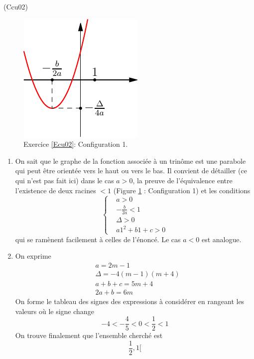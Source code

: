 \begin{tiny}(Ccu02)\end{tiny}
\begin{figure}[h]
  \centering
  \includegraphics{./Ccu02_1.pdf}
  \caption{Exercice \ref{Ecu02}: Configuration 1.}
  \label{fig:Ccu02_1}
\end{figure}
\begin{enumerate}
  \item On sait que le graphe de la fonction associée à un trinôme est une parabole qui peut être orientée vers le haut ou vers le bas.\newline
  Il convient de détailler (ce qui n'est pas fait ici) dans le cas $a>0$, la preuve de l'équivalence entre l'existence de deux racines $<1$ (Figure \ref{fig:Ccu02_1} : Configuration 1) et les conditions
\begin{displaymath}
  \left\lbrace 
\begin{aligned}
&a>0\\ &-\frac{b}{2a}<1 \\ &\Delta > 0 \\ &a1^2+b1+c >0  
\end{aligned}
\right. 
\end{displaymath}
qui se ramènent facilement à celles de l'énoncé. Le cas $a<0$ est analogue.
  \item On exprime
\begin{align*}
  &a = 2m-1 \\
  &\Delta = -4(m-1)(m+4)\\
  &a+b+c = 5m+4 \\
  &2a+b =6m
\end{align*}
On forme le tableau des signes des expressions à considérer en rangeant les valeurs où le signe change
\begin{displaymath}
  -4  < -\frac{4}{5} < 0 < \frac{1}{2} < 1
\end{displaymath}
On trouve finalement que l'ensemble cherché est
\begin{displaymath}
  [-\frac{5}{4},0[ \,\cup\, ]\frac{1}{2},1[
\end{displaymath}

\end{enumerate}
